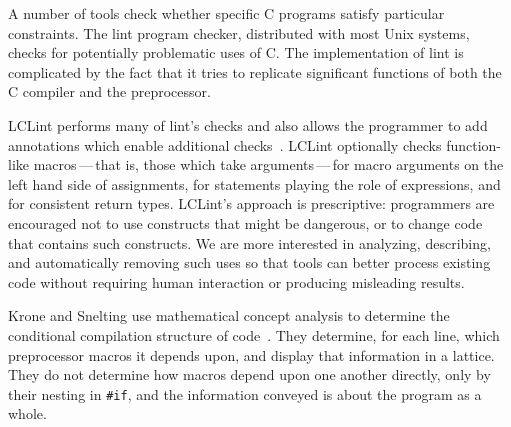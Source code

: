\documentclass[11pt]{article}
\begin{document}
A number of tools check whether specific C programs satisfy particular
constraints.  The lint program checker, distributed with most Unix systems,
checks for potentially problematic uses of C\@.  The implementation of lint
is complicated by the fact that it tries to replicate significant functions
of both the C compiler and the preprocessor.

LCLint performs many of lint's checks and also
allows the programmer to add annotations which enable additional
checks~\cite{Evans-pldi96,Evans-fse94}.
LCLint optionally checks function-like
macros\,---\,that is, those which take arguments\,---\,for
macro arguments on the left hand side of assignments, for statements
playing the role of expressions, and for consistent return types.
LCLint's approach is prescriptive: programmers are encouraged not to use
constructs that might be dangerous, or to change code that contains such
constructs.  We are more interested in analyzing, describing, and
automatically removing such uses so that tools can better process existing
code without requiring human interaction or producing misleading results.


Krone and Snelting use mathematical concept analysis to determine the
conditional compilation structure of code~\cite{Krone94}.  They determine,
for each line, which preprocessor macros it depends upon, and display that
information in a lattice.  They do not determine how macros depend upon one
another directly, only by their nesting in {\tt \#if}, and the information
conveyed is about the program as a whole.


{\small }
\end{document}
